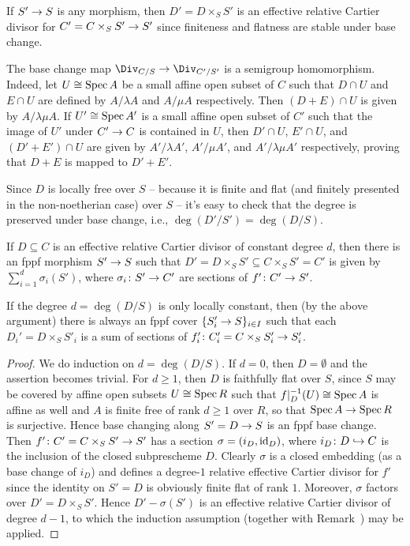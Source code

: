 \documentclass[a4paper,parskip=half,numbers=enddot, DIV=12]{scrreprt}
\renewcommand{\geq}{\geqslant}
\begin{document}
\begin{rem}
	\begin{alphanumerate}
		\item {}If $S'\morphism S$ is any morphism, then $D'=D\times_SS'$ is an effective relative Cartier divisor for $C'=C\times_SS'\morphism S'$ since finiteness and flatness are stable under base change.
		\item The base change map $\Div_{C/S}\morphism\Div_{C'/S'}$ is a semigroup homomorphism. Indeed, let $U\cong \operatorname{Spec} A$ be a small affine open subset of $C$ such that $D\cap U$ and $E\cap U$ are defined by $A/\lambda A$ and $A/\mu A$ respectively. Then $(D+E)\cap U$ is given by $A/\lambda\mu A$. If $U'\cong \operatorname{Spec} A'$ is a small affine open subset of $C'$ such that the image of $U'$ under $C'\morphism C$ is contained in $U$, then $D'\cap U$, $E'\cap U$, and $(D'+E')\cap U$ are given by $A'/\lambda A'$, $A'/\mu A'$, and $A'/\lambda\mu A'$ respectively, proving that $D+E$ is mapped to $D'+E'$.
		\item Since $D$ is locally free over $S$ -- because it is finite and flat (and finitely presented in the non-noetherian case) over $S$ -- it's easy to check that the degree is preserved under base change, i.e., $\deg(D'/S')=\deg(D/S)$.
	\end{alphanumerate}
	\end{rem}
\begin{lem}
	If $D\subseteq C$ is an effective relative Cartier divisor of constant degree $d$, then there is an fppf morphism $S'\morphism S$ such that $D'=D\times_SS'\subseteq C\times_SS'=C'$ is given by $\sum_{i=1}^d\sigma_i(S')$, where $\sigma_i\colon S'\morphism C'$ are sections of $f'\colon C'\morphism S'$.
\end{lem}
\begin{rem}
	If the degree $d=\deg (D/S)$ is only locally constant, then (by the above argument) there is always an fppf cover $\{S'_i\morphism S\}_{i\in I}$ such that each $D_i'=D\times_SS'_i$ is a sum of sections of $f'_i\colon C'_i=C\times_SS'_i\morphism S'_i$.
\end{rem}
\begin{proof}
	We do induction on $d=\deg(D/S)$. If $d=0$, then $D=\emptyset$ and the assertion becomes trivial. For $d\geq 1$, then $D$ is faithfully flat over $S$, since $S$ may be covered by affine open subsets $U\cong \operatorname{Spec} R$ such that $f|_D^{-1}(U)\cong \operatorname{Spec} A$ is affine as well and $A$ is finite free of rank $d\geq 1$ over $R$, so that $\Spec A\morphism\Spec R$ is surjective. Hence base changing along $S'=D\morphism S$ is an fppf base change. Then $f'\colon C'=C\times_SS'\morphism S'$ has a section $\sigma=(i_D,\operatorname{id}_D)$, where $i_D\colon D\monomorphism C$ is the inclusion of the closed subprescheme $D$. Clearly $\sigma$ is a closed embedding (as a base change of $i_D$) and defines a degree-$1$ relative effective Cartier divisor for $f'$ since the identity on $S'=D$ is obviously finite flat of rank $1$. Moreover, $\sigma$ factors over $D'=D\times_SS'$. Hence $D'-\sigma(S')$ is an effective relative Cartier divisor of degree $d-1$, to which the induction assumption (together with Remark~) may be applied.
\end{proof}
\end{document}
